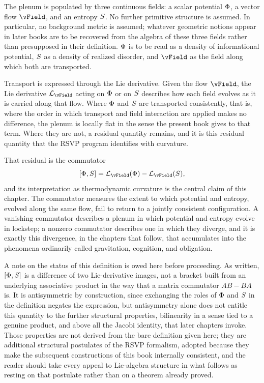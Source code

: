 The plenum is populated by three continuous fields: a scalar potential $\Phi$, a vector flow $\vField$, and an entropy $S$. No further primitive structure is assumed. In particular, no background metric is assumed; whatever geometric notions appear in later books are to be recovered from the algebra of these three fields rather than presupposed in their definition. $\Phi$ is to be read as a density of informational potential, $S$ as a density of realized disorder, and $\vField$ as the field along which both are transported.

Transport is expressed through the Lie derivative. Given the flow $\vField$, the Lie derivative $\mathcal{L}_{\vField}$ acting on $\Phi$ or on $S$ describes how each field evolves as it is carried along that flow. Where $\Phi$ and $S$ are transported consistently, that is, where the order in which transport and field interaction are applied makes no difference, the plenum is locally flat in the sense the present book gives to that term. Where they are not, a residual quantity remains, and it is this residual quantity that the RSVP program identifies with curvature.

That residual is the commutator
\[
[\PhiField, \SEntropy] = \mathcal{L}_{\vField}(\PhiField) - \mathcal{L}_{\vField}(\SEntropy),
\]
and its interpretation as thermodynamic curvature is the central claim of this chapter. The commutator measures the extent to which potential and entropy, evolved along the same flow, fail to return to a jointly consistent configuration. A vanishing commutator describes a plenum in which potential and entropy evolve in lockstep; a nonzero commutator describes one in which they diverge, and it is exactly this divergence, in the chapters that follow, that accumulates into the phenomena ordinarily called gravitation, cognition, and obligation.

A note on the status of this definition is owed here before proceeding. As written, $[\Phi, S]$ is a difference of two Lie-derivative images, not a bracket built from an underlying associative product in the way that a matrix commutator $AB - BA$ is. It is antisymmetric by construction, since exchanging the roles of $\Phi$ and $S$ in the definition negates the expression, but antisymmetry alone does not entitle this quantity to the further structural properties, bilinearity in a sense tied to a genuine product, and above all the Jacobi identity, that later chapters invoke. Those properties are not derived from the bare definition given here; they are additional structural postulates of the RSVP formalism, adopted because they make the subsequent constructions of this book internally consistent, and the reader should take every appeal to Lie-algebra structure in what follows as resting on that postulate rather than on a theorem already proved.

